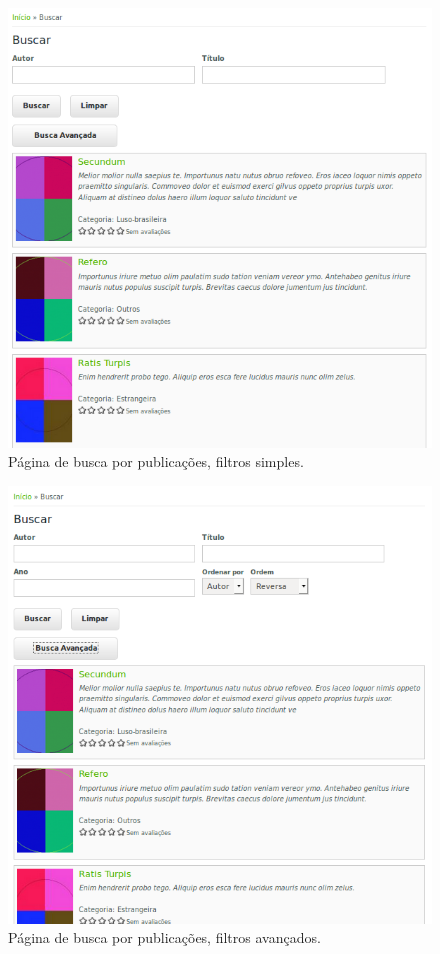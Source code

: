 \documentclass[a4paper]{article}
\begin{document}
\begin{figure}[pbth!]
\centering
\includegraphics[width=120mm]{img/browse-simple.png}
\caption{Página de busca por publicações, filtros simples.\label{simple}}
\end{figure}

\begin{figure}[pbth!]
\centering
\includegraphics[width=120mm]{img/browse-advanced.png}
\caption{Página de busca por publicações, filtros avançados.\label{advanced}}
\end{figure}
\end{document}
